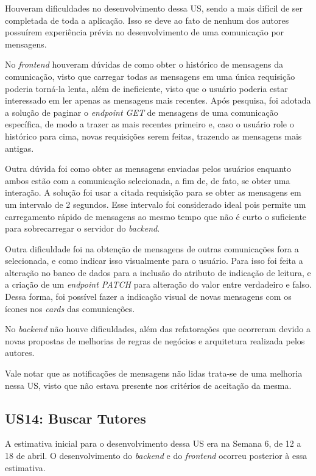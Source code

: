 Houveram dificuldades no desenvolvimento dessa US, sendo a mais difícil de ser completada de toda a aplicação. Isso se deve ao fato de nenhum dos autores possuírem experiência prévia no desenvolvimento de uma comunicação por mensagens.

No \textit{frontend} houveram dúvidas de como obter o histórico de mensagens da comunicação, visto que carregar todas as mensagens em uma única requisição poderia torná-la lenta, além de ineficiente, visto que o usuário poderia estar interessado em ler apenas as mensagens mais recentes. Após pesquisa, foi adotada a solução de paginar o \textit{endpoint GET} de mensagens de uma comunicação específica, de modo a trazer as mais recentes primeiro e, caso o usuário role o histórico para cima, novas requisições serem feitas, trazendo as mensagens mais antigas.

Outra dúvida foi como obter as mensagens enviadas pelos usuários enquanto ambos estão com a comunicação selecionada, a fim de, de fato, se obter uma interação. A solução foi usar a citada requisição para se obter as mensagens em um intervalo de 2 segundos. Esse intervalo foi considerado ideal pois permite um carregamento rápido de mensagens ao mesmo tempo que não é curto o suficiente para sobrecarregar o servidor do \textit{backend}.

Outra dificuldade foi na obtenção de mensagens de outras comunicações fora a selecionada, e como indicar isso visualmente para o usuário. Para isso foi feita a alteração no banco de dados para a inclusão do atributo de indicação de leitura, e a criação de um \textit{endpoint PATCH} para alteração do valor entre verdadeiro e falso. Dessa forma, foi possível fazer a indicação visual de novas mensagens com os ícones nos \textit{cards} das comunicações.

No \textit{backend} não houve dificuldades, além das refatorações que ocorreram devido a novas propostas de melhorias de regras de negócios e arquitetura realizada pelos autores.

Vale notar que as notificações de mensagens não lidas trata-se de uma melhoria nessa US, visto que não estava presente nos critérios de aceitação da mesma.

\subsection[US14: Buscar Tutores]{US14: Buscar Tutores}

A estimativa inicial para o desenvolvimento dessa US era na Semana 6, de 12 a 18 de abril. O desenvolvimento do \textit{backend} e do \textit{frontend} ocorreu posterior à essa estimativa.

